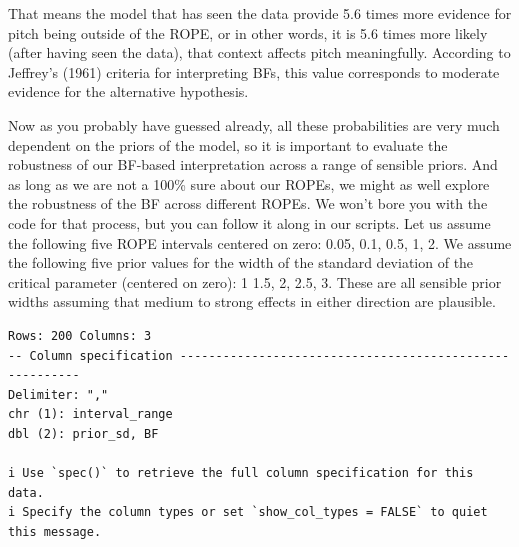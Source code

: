 \documentclass[
  doc,
  longtable,
  nolmodern,
  notxfonts,
  notimes,
  colorlinks=true,linkcolor=blue,citecolor=blue,urlcolor=blue]{apa7}
\begin{document}
That means the model that has seen the data provide 5.6 times more
evidence for pitch being outside of the ROPE, or in other words, it is
5.6 times more likely (after having seen the data), that context affects
pitch meaningfully. According to Jeffrey's (1961) criteria for
interpreting BFs, this value corresponds to moderate evidence for the
alternative hypothesis.

Now as you probably have guessed already, all these probabilities are
very much dependent on the priors of the model, so it is important to
evaluate the robustness of our BF-based interpretation across a range of
sensible priors. And as long as we are not a 100\% sure about our ROPEs,
we might as well explore the robustness of the BF across different
ROPEs. We won't bore you with the code for that process, but you can
follow it along in our scripts. Let us assume the following five ROPE
intervals centered on zero: 0.05, 0.1, 0.5, 1, 2. We assume the
following five prior values for the width of the standard deviation of
the critical parameter (centered on zero): 1 1.5, 2, 2.5, 3. These are
all sensible prior widths assuming that medium to strong effects in
either direction are plausible.

\begin{verbatim}
Rows: 200 Columns: 3
-- Column specification --------------------------------------------------------
Delimiter: ","
chr (1): interval_range
dbl (2): prior_sd, BF

i Use `spec()` to retrieve the full column specification for this data.
i Specify the column types or set `show_col_types = FALSE` to quiet this message.
\end{verbatim}
\end{document}
